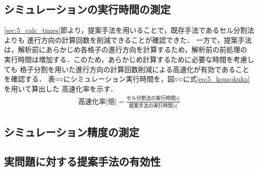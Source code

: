 \clearpage
\subsection{シミュレーションの実行時間の測定}
\ref{sec:5_calc_times}節より，提案手法を用いることで，既存手法であるセル分割法よりも
進行方向の計算回数を削減できることが確認できた．
一方で，提案手法は，解析前にあらかじめ各格子の進行方向を計算するため，解析前の前処理の
実行時間は増加する．このため，あらかじめ計算するために必要な時間を考慮しても
格子分割を用いた進行方向の計算回数削減による高速化が有効であることを確認する．
表○○にシミュレーション実行時間を，図○○に式\eqref{eq:5_kousokuka}を用いて算出した
高速化率を示す．
%
\begin{align}
	\mbox{高速化率[倍]} = \frac{\mbox{セル分割法の実行時間[s]}}
    {\mbox{提案手法の実行時間[s]}}
    \label{eq:5_kousokuka}
\end{align}
%

\clearpage
\subsection{シミュレーション精度の測定}


\clearpage
\subsection{実問題に対する提案手法の有効性}


